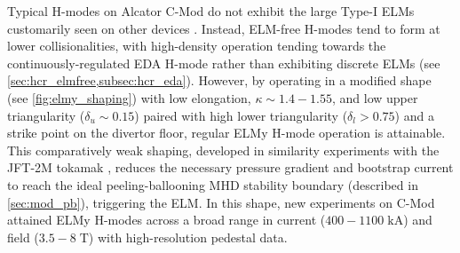 \begin{figure}[t]
 \pushtooutside
\end{figure}

Typical H-modes on Alcator C-Mod do not exhibit the large Type-I ELMs customarily seen on other devices \cite{Greenwald2007}.  Instead, ELM-free H-modes tend to form at lower collisionalities, with high-density operation tending towards the continuously-regulated EDA H-mode rather than exhibiting discrete ELMs (see \cref{sec:hcr_elmfree,subsec:hcr_eda}).  However, by operating in a modified shape (see \cref{fig:elmy_shaping}) with low elongation, $\kappa \sim 1.4-1.55$, and low upper triangularity ($\delta_u \sim 0.15$) paired with high lower triangularity ($\delta_l > 0.75$) and a strike point on the divertor floor, regular ELMy H-mode operation is attainable.  This comparatively weak shaping, developed in similarity experiments with the JFT-2M tokamak \cite{Hughes2011,Terry2007a}, reduces the necessary pressure gradient and bootstrap current to reach the ideal peeling-ballooning MHD stability boundary (described in \cref{sec:mod_pb}), triggering the ELM.  In this shape, new experiments on C-Mod \cite{Walk2012} attained ELMy H-modes across a broad range in current ($400-1100 \;\si{\kilo\ampere}$) and field ($3.5-8 \;\si{\tesla}$) with high-resolution pedestal data.

